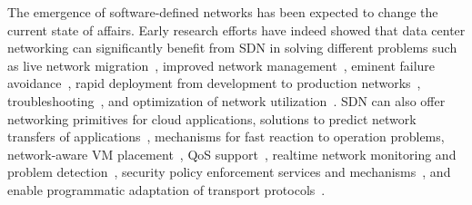 The emergence of software-defined networks has been expected to change the current state of affairs.
Early research efforts have indeed showed that data center networking can significantly benefit from SDN in solving different problems such as live network migration~\cite{keller2012}, improved network management~\cite{keller2012,arefin2013}, eminent failure avoidance~\cite{keller2012,arefin2013}, rapid deployment from development to production networks~\cite{keller2012}, troubleshooting~\cite{keller2012,raghavendra2012}, and optimization of network utilization~\cite{raghavendra2012,wang2012,das2013,arefin2013}.
SDN can also offer networking primitives for cloud applications, solutions to predict network transfers of applications~\cite{wang2012,das2013}, mechanisms for fast reaction to operation problems, network-aware VM placement~\cite{raghavendra2012,benson2011},  QoS support~\cite{raghavendra2012,benson2011}, realtime network monitoring and problem detection~\cite{raghavendra2012,das2013,arefin2013}, security policy enforcement services and mechanisms~\cite{raghavendra2012,benson2011}, and enable programmatic adaptation of transport protocols~\cite{wang2012,ghobadi2013}.

%

%

